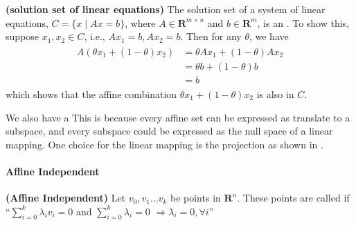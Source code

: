 \documentclass{article}
\newcommand{\bfs}[1]{\textbf{({#1}) }}
\begin{document}
\begin{exma}{\bfs{solution set of linear equations}}\label{exm:linear_aff}
  The solution set of a system of linear equations, $C=\{x \mid A x=b\}$, where $A \in \mathbf{R}^{m \times n}$ and $b \in \mathbf{R}^{m}$, is an . To show this, suppose $x_{1}, x_{2} \in C$, i.e., $A x_{1}=b, A x_{2}=b$. Then for any $\theta$, we have
\begin{align*}
\begin{aligned}
A\left(\theta x_{1}+(1-\theta) x_{2}\right) &=\theta A x_{1}+(1-\theta) A x_{2} \\
&=\theta b+(1-\theta) b \\
&=b
\end{aligned}
\end{align*}
which shows that the affine combination $\theta x_{1}+(1-\theta) x_{2}$ is also in $C$. 

We also have a  This is because every affine set can be expressed as translate to a subspace, and every subspace could be expressed as the null space of a linear mapping. One choice for the linear mapping is the projection as shown in \cite[229]{rudin1976principles}.
\end{exma}

\paragraph{Affine Independent}
\begin{defa}{\bfs{Affine Independent}}\label{sec:aff_ind}
 Let $v_{0}, v_{1} \ldots v_{k}$ be points in $\mathbf{R}^{n}$. These points are called  if ``$\sum_{i=0}^{k} \lambda_{i} v_{i}=0$ and $\sum_{i=0}^{k} \lambda_{i}=0$ $\Rightarrow \lambda_{i}=0, \forall i$''
\end{defa} 
\end{document}

